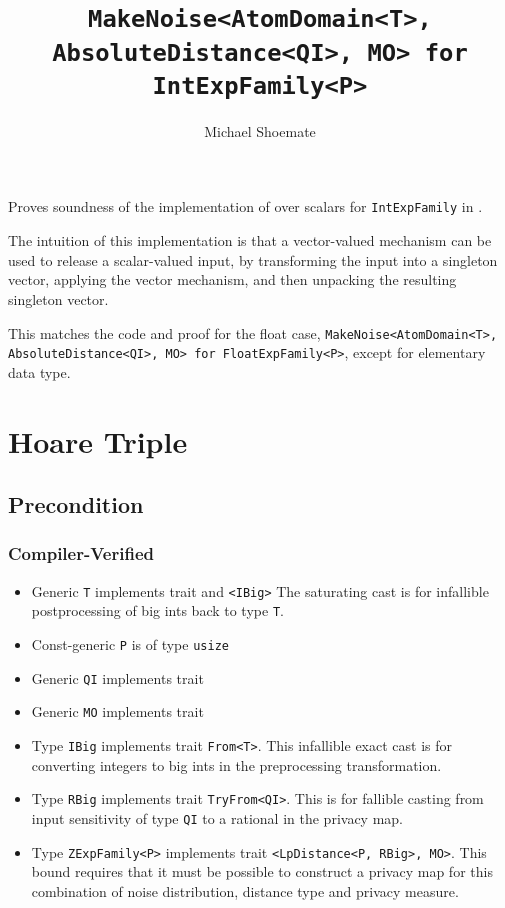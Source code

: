 \documentclass{article}
\title{\texttt{MakeNoise<AtomDomain<T>, AbsoluteDistance<QI>, MO> for IntExpFamily<P>}}
\author{Michael Shoemate}
\date{}
\begin{document}
\maketitle

\contrib
Proves soundness of the implementation of  over scalars
for \texttt{IntExpFamily} in .

The intuition of this implementation is that a vector-valued mechanism can be used to release a scalar-valued input,
by transforming the input into a singleton vector, 
applying the vector mechanism, and then unpacking the resulting singleton vector.

This matches the code and proof for the float case, \texttt{MakeNoise<AtomDomain<T>, AbsoluteDistance<QI>, MO> for FloatExpFamily<P>},
except for elementary data type.

\section{Hoare Triple}
\subsection*{Precondition}
\subsubsection*{Compiler-Verified}

\begin{itemize}
    \item Generic \texttt{T} implements trait  and \texttt{<IBig>}
        The saturating cast is for infallible postprocessing of big ints back to type \texttt{T}.
    \item Const-generic \texttt{P} is of type \texttt{usize}
    \item Generic \texttt{QI} implements trait 
    \item Generic \texttt{MO} implements trait 
    \item Type \texttt{IBig} implements trait \texttt{From<T>}.
        This infallible exact cast is for converting integers to big ints in the preprocessing transformation.
    \item Type \texttt{RBig} implements trait \texttt{TryFrom<QI>}.
        This is for fallible casting from input sensitivity of type \texttt{QI} to a rational in the privacy map.
    \item Type \texttt{ZExpFamily<P>} implements trait \texttt{<LpDistance<P, RBig>, MO>}.
        This bound requires that it must be possible to construct a privacy map for this combination of noise distribution, distance type and privacy measure.
\end{itemize}
\end{document}
